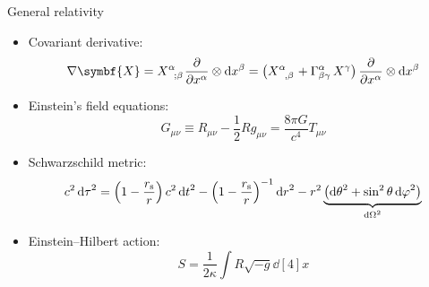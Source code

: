 \documentclass[aspectratio=169]{beamer}
\begin{document}
\begin{frame}[noframenumbering]{General relativity}
\begin{itemize}
  \item Covariant derivative:
    \[
      \nabla \symbf{X} = \tensor{X}{^\alpha_{;\beta}} \pdv{x^\alpha} \otimes \dd{x^\beta}
                       = \qty(\tensor{X}{^\alpha_{,\beta}} + \Gamma^{\alpha}_{\beta\gamma} \, X^\gamma) \,
                         \pdv{x^\alpha} \otimes \dd{x^\beta}
    \]
  \item Einstein's field equations:
    \[ G_{\mu\nu} \equiv R_{\mu\nu} - \frac{1}{2} R g_{\mu\nu} = \frac{8\pi G}{c^4} T_{\mu\nu} \]
  \item Schwarzschild metric:
    \[
      c^2 \dd{\tau}^2 = \qty(1-\frac{r_{\mathrm{s}}}{r}) \, c^2 \dd{t}^2
                      - \qty(1-\frac{r_{\mathrm{s}}}{r})^{-1} \dd{r}^2
                      - r^2 \underbrace{\qty(\dd{\theta}^2 + \sin^2 \theta \dd{\varphi}^2)}_{\dd{\Omega}^2}
    \]
  \item Einstein--Hilbert action:
    \[ S = \frac{1}{2\kappa} \int R \sqrt{-g} \dd[4]{x} \]
\end{itemize}
\end{frame}
\end{document}
